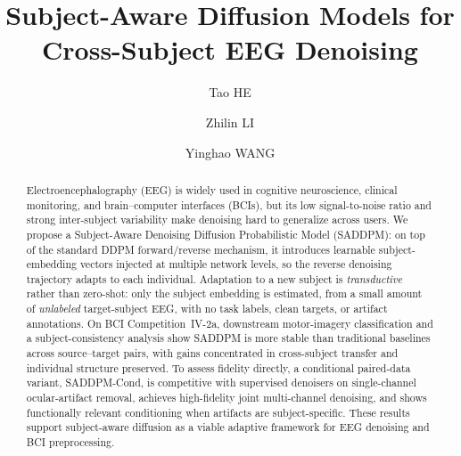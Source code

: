 \documentclass[acmsmall,screen,review]{acmart}
\newcommand{\saddpmcond}{SADDPM-Cond}
\begin{document}
\title{Subject-Aware Diffusion Models for Cross-Subject EEG Denoising}

\author{Tao HE}
{}

\author{Zhilin LI}
\author{Yinghao WANG}
\correspondingauthor
{}
\renewcommand{\shortauthors}{He et al.}

\begin{abstract}
Electroencephalography (EEG) is widely used in cognitive neuroscience, clinical monitoring, and brain--computer interfaces (BCIs), but its low signal-to-noise ratio and strong inter-subject variability make denoising hard to generalize across users. We propose a Subject-Aware Denoising Diffusion Probabilistic Model (SADDPM): on top of the standard DDPM forward/reverse mechanism, it introduces learnable subject-embedding vectors injected at multiple network levels, so the reverse denoising trajectory adapts to each individual. Adaptation to a new subject is \emph{transductive} rather than zero-shot: only the subject embedding is estimated, from a small amount of \emph{unlabeled} target-subject EEG, with no task labels, clean targets, or artifact annotations. On BCI Competition~IV-2a, downstream motor-imagery classification and a subject-consistency analysis show SADDPM is more stable than traditional baselines across source--target pairs, with gains concentrated in cross-subject transfer and individual structure preserved. To assess fidelity directly, a conditional paired-data variant, \saddpmcond{}, is competitive with supervised denoisers on single-channel ocular-artifact removal, achieves high-fidelity joint multi-channel denoising, and shows functionally relevant conditioning when artifacts are subject-specific. These results support subject-aware diffusion as a viable adaptive framework for EEG denoising and BCI preprocessing.

\end{abstract}
\end{document}

